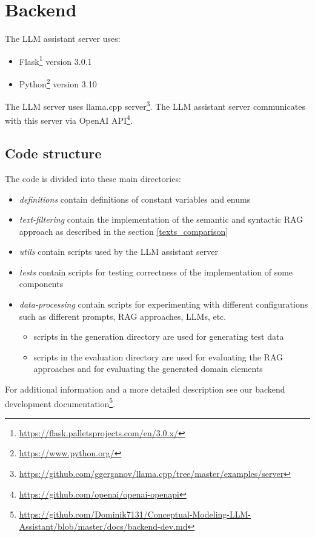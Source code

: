 \section{Backend}

\noindent{}The LLM assistant server uses:
\begin{itemize}
\item Flask\footnote{\url{https://flask.palletsprojects.com/en/3.0.x/}} version 3.0.1
\item Python\footnote{\url{https://www.python.org/}} version 3.10
\end{itemize}

\noindent{}The LLM server uses llama.cpp server\footnote{\url{https://github.com/ggerganov/llama.cpp/tree/master/examples/server}}. The LLM assistant server communicates with this server via OpenAI API\footnote{\url{https://github.com/openai/openai-openapi}}.


\subsection{Code structure}

\noindent{}The code is divided into these main directories:
\begin{itemize}
\item \textit{definitions} contain definitions of constant variables and enums
\item \textit{text-filtering} contain the implementation of the semantic and syntactic RAG approach as described in the section \ref{texts_comparison}
\item \textit{utils} contain scripts used by the LLM assistant server
\item \textit{tests} contain scripts for testing correctness of the implementation of some components
\item \textit{data-processing} contain scripts for experimenting with different configurations such as different prompts, RAG approaches, LLMs, etc.
\begin{itemize}
\item scripts in the generation directory are used for generating test data
\item scripts in the evaluation directory are used for evaluating the RAG approaches and for evaluating the generated domain elements
\end{itemize}
\end{itemize}

\noindent{}For additional information and a more detailed description see our backend development documentation\footnote{\url{https://github.com/Dominik7131/Conceptual-Modeling-LLM-Assistant/blob/master/docs/backend-dev.md}}.


